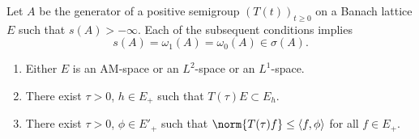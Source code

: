 \begin{theorem}\label{thm:c4-1.1}
Let $A$ be the generator of a positive semigroup $(T(t))_{t \geq 0}$ on a Banach lattice $E$ such that $s(A) > -\infty$.
Each of the subsequent conditions implies
\begin{equation*}\label{eq:c4-1.0-kgk}
s(A) = \omega_{1}(A) = \omega_{0}(A) \in \sigma(A) .
\end{equation*}
\begin{enumerate}[\upshape (i)] 
    \item \label{thm:c4-1.1-1}
    Either $E$ is an AM-space or an $L^{2}$-space or an $L^{1}$-space.
    
    \item \label{thm:c4-1.1-2}
    There exist $\tau > 0$, $h \in E_{+}$ such that $T(\tau)E \subset E_{h}$.
    
    \item \label{thm:c4-1.1-3}
    There exist $\tau > 0$, $\phi \in E'_{+}$ such that $\norm{T(\tau)f} \leq \langle f,\phi\rangle$ for all $f \in E_{+}$.
\end{enumerate}
\end{theorem}
